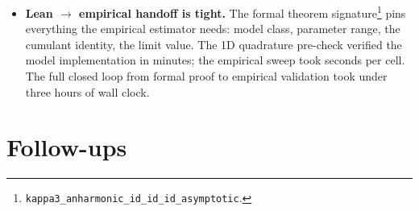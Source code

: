 \documentclass[11pt]{article}
\begin{document}
\begin{itemize}[noitemsep,leftmargin=*]
  \item \textbf{Lean $\to$ empirical handoff is tight.} The formal
    theorem signature\footnote{\texttt{kappa3\_anharmonic\_id\_id\_id\_asymptotic}.}
    pins everything the empirical estimator needs: model class,
    parameter range, the cumulant identity, the limit value. The
    1D quadrature pre-check verified the model implementation in
    minutes; the empirical sweep took seconds per cell. The full
    closed loop from formal proof to empirical validation took
    under three hours of wall clock.
\end{itemize}

\section{Follow-ups}
\end{document}
